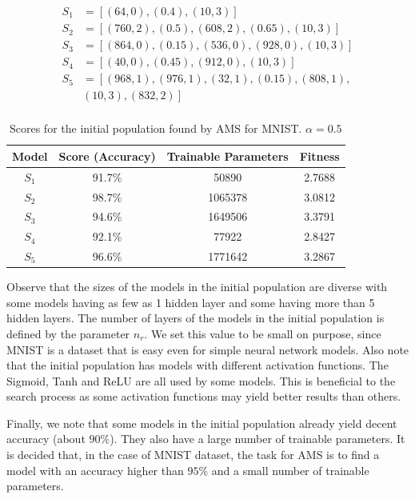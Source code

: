 \documentclass[12pt]{elsart}%
\begin{document}
\begin{align*}
S_1 & = \left[ (64, 0), (0.4), (10, 3) \right] \\
S_2 & = \left[ (760, 2), (0.5), (608, 2), (0.65), (10, 3) \right] \\
S_3 & = \left[ (864, 0), (0.15), (536, 0), (928, 0), (10, 3) \right] \\
S_4 & = \left[ (40,0), (0.45), (912, 0), (10, 3) \right] \\
S_5 & = \left[ (968, 1), (976, 1), (32, 1), (0.15), (808, 1), \right.\\
& \left. (10, 3), (832, 2) \right] \\
\end{align*}

\begin{table}[!htb]
\begin{center}
\begin{tabular}{| c | c | c | c |}
\hline
Model & Score (Accuracy) & Trainable Parameters & Fitness\\
\hline
$S_1$ & 91.7\% & 50890 & 2.7688\\
$S_2$ & 98.7\% & 1065378 & 3.0812\\
$S_3$ & 94.6\% & 1649506 & 3.3791\\
$S_4$ & 92.1\% & 77922 & 2.8427\\
$S_5$ & 96.6\% & 1771642 & 3.2867\\
\hline
\end{tabular}
\end{center}
\caption{Scores for the initial population found by AMS for MNIST. $\alpha = 0.5$}
\label{table:ams_mnist_initial}
\end{table} 

Observe that the sizes of the models in the initial population are diverse with some models having as few as 1 hidden layer and some having more than 5 hidden layers. The number of layers of the models in the initial population is defined by the parameter $n_r$. We set this value to be small on purpose, since MNIST is a dataset that is easy even for simple neural network models. Also note that the initial population has models with different activation functions. The Sigmoid, Tanh and ReLU are all used by some models. This is beneficial to the search process as some activation functions may yield better results than others.

Finally, we note that some models in the initial population already yield decent accuracy (about $90\%$). They also have a large number of trainable parameters. It is decided that, in the case of MNIST dataset, the task for AMS is to find a model with an accuracy higher than $95\%$ and a small number of trainable parameters.
\end{document}
